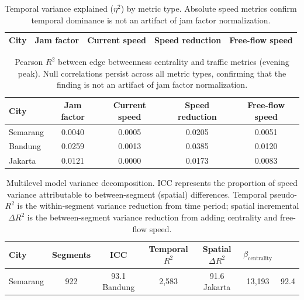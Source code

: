 \begin{table}[htbp]
\centering
\caption{Temporal variance explained ($\eta^2$) by metric type. Absolute speed metrics confirm temporal dominance is not an artifact of jam factor normalization.}
\label{tab:speed_validation}
\begin{tabular}{lcccc}
\toprule
City & Jam factor & Current speed & Speed reduction & Free-flow speed \\
\midrule
\bottomrule
\end{tabular}
\end{table}

\begin{table}[htbp]
\centering
\caption{Pearson $R^2$ between edge betweenness centrality and traffic metrics (evening peak). Null correlations persist across all metric types, confirming that the finding is not an artifact of jam factor normalization.}
\label{tab:centrality_speed}
\begin{tabular}{lcccc}
\toprule
City & Jam factor & Current speed & Speed reduction & Free-flow speed \\
\midrule
Semarang & 0.0040 & 0.0005 & 0.0205 & 0.0051 \\
Bandung & 0.0259 & 0.0013 & 0.0385 & 0.0120 \\
Jakarta & 0.0121 & 0.0000 & 0.0173 & 0.0083 \\
\bottomrule
\end{tabular}
\end{table}

\begin{table}[htbp]
\centering
\caption{Multilevel model variance decomposition. ICC represents the proportion of speed variance attributable to between-segment (spatial) differences. Temporal pseudo-$R^2$ is the within-segment variance reduction from time period; spatial incremental $\Delta R^2$ is the between-segment variance reduction from adding centrality and free-flow speed.}
\label{tab:multilevel}
\begin{tabular}{lccccc}
\toprule
City & Segments & ICC & Temporal $R^2$ & Spatial $\Delta R^2$ & $\beta_{\text{centrality}}$ \\
\midrule
Semarang & 922 & 93.1%
Bandung & 2,583 & 91.6%
Jakarta & 13,193 & 92.4%
\bottomrule
\end{tabular}
\end{table}